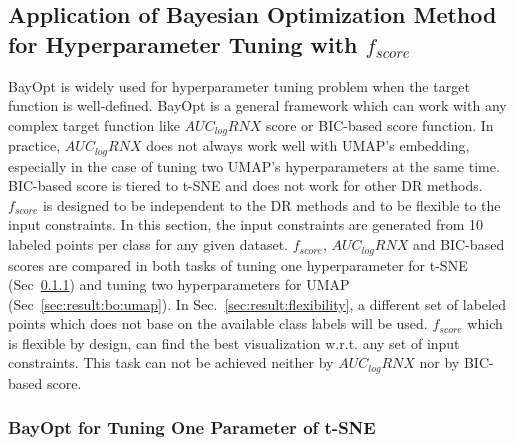 \subsection{Application of Bayesian Optimization Method for Hyperparameter Tuning with $f_{score}$}\label{sec:result:bo}
BayOpt is widely used for hyperparameter tuning problem when the target function is well-defined.
BayOpt is a general framework which can work with any complex target function like $AUC_{log}RNX$ score or BIC-based score function.
In practice, $AUC_{log}RNX$ does not always work well with UMAP's embedding, especially in the case of tuning two UMAP's hyperparameters at the same time.
BIC-based score is tiered to t-SNE and does not work for other DR methods.
$f_{score}$ is designed to be independent to the DR methods and to be flexible to the input constraints.
In this section, the input constraints are generated from 10 labeled points per class for any given dataset.
$f_{score}$, $AUC_{log}RNX$ and BIC-based scores are compared in both tasks of tuning one hyperparameter for t-SNE (Sec~\ref{sec:result:bo:tsne}) and tuning two hyperparameters for UMAP (Sec~\ref{sec:result:bo:umap}).
In Sec.~\ref{sec:result:flexibility}, a different set of labeled points which does not base on the available class labels will be used.
$f_{score}$ which is flexible by design, can find the best visualization w.r.t. any set of input constraints.
This task can not be achieved neither by $AUC_{log}RNX$ nor by BIC-based score.

\subsubsection{BayOpt for Tuning One Parameter of t-SNE}\label{sec:result:bo:tsne}

